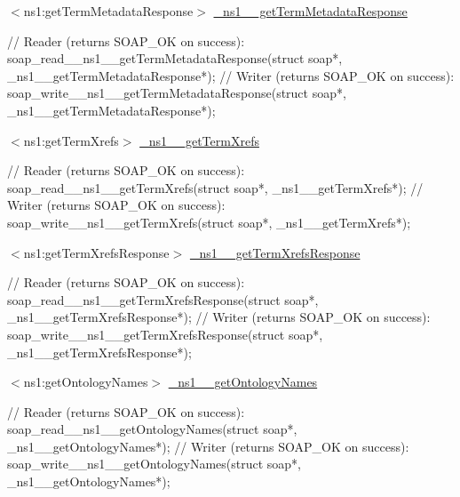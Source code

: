 \begin{DoxyItemize}
\item $<$ns1:getTermMetadataResponse$>$ \hyperlink{class__ns1____getTermMetadataResponse}{\_\-ns1\_\-\_\-getTermMetadataResponse} 
\begin{DoxyCode}
    // Reader (returns SOAP_OK on success):
    soap_read__ns1__getTermMetadataResponse(struct soap*, 
      _ns1__getTermMetadataResponse*);
    // Writer (returns SOAP_OK on success):
    soap_write__ns1__getTermMetadataResponse(struct soap*, 
      _ns1__getTermMetadataResponse*);
\end{DoxyCode}

\end{DoxyItemize}


\begin{DoxyItemize}
\item $<$ns1:getTermXrefs$>$ \hyperlink{class__ns1____getTermXrefs}{\_\-ns1\_\-\_\-getTermXrefs} 
\begin{DoxyCode}
    // Reader (returns SOAP_OK on success):
    soap_read__ns1__getTermXrefs(struct soap*, _ns1__getTermXrefs*);
    // Writer (returns SOAP_OK on success):
    soap_write__ns1__getTermXrefs(struct soap*, _ns1__getTermXrefs*);
\end{DoxyCode}

\end{DoxyItemize}


\begin{DoxyItemize}
\item $<$ns1:getTermXrefsResponse$>$ \hyperlink{class__ns1____getTermXrefsResponse}{\_\-ns1\_\-\_\-getTermXrefsResponse} 
\begin{DoxyCode}
    // Reader (returns SOAP_OK on success):
    soap_read__ns1__getTermXrefsResponse(struct soap*, 
      _ns1__getTermXrefsResponse*);
    // Writer (returns SOAP_OK on success):
    soap_write__ns1__getTermXrefsResponse(struct soap*, 
      _ns1__getTermXrefsResponse*);
\end{DoxyCode}

\end{DoxyItemize}


\begin{DoxyItemize}
\item $<$ns1:getOntologyNames$>$ \hyperlink{class__ns1____getOntologyNames}{\_\-ns1\_\-\_\-getOntologyNames} 
\begin{DoxyCode}
    // Reader (returns SOAP_OK on success):
    soap_read__ns1__getOntologyNames(struct soap*, _ns1__getOntologyNames*);
    // Writer (returns SOAP_OK on success):
    soap_write__ns1__getOntologyNames(struct soap*, _ns1__getOntologyNames*);
\end{DoxyCode}

\end{DoxyItemize}



